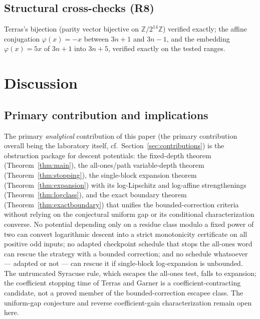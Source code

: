 \documentclass[11pt]{amsart}
\theoremstyle{definition}
\theoremstyle{remark}
\newcommand{\Z}{\mathbb{Z}}
\begin{document}
\subsection{Structural cross-checks (R8)}\label{sec:results-structure}
Terras's bijection (parity vector bijective on $\Z/2^{14}\Z$) verified exactly; the affine conjugation $\varphi(x) = -x$ between $3n+1$ and $3n-1$, and the embedding $\varphi(x) = 5x$ of $3n+1$ into $3n+5$, verified exactly on the tested ranges.

\section{Discussion}\label{sec:discussion}

\subsection*{Primary contribution and implications}
The primary \emph{analytical} contribution of this paper (the primary contribution overall being the laboratory itself, cf.\ Section~\ref{sec:contributions}) is the obstruction package for descent potentials: the fixed-depth theorem (Theorem~\ref{thm:main}), the all-ones/path variable-depth theorem (Theorem~\ref{thm:stopping}), the single-block expansion theorem (Theorem~\ref{thm:expansion}) with its log-Lipschitz and log-affine strengthenings (Theorem~\ref{thm:logclass}), and the exact boundary theorem (Theorem~\ref{thm:exactboundary}) that unifies the bounded-correction criteria without relying on the conjectural uniform gap or its conditional characterization converse. No potential depending only on a residue class modulo a fixed power of two can convert logarithmic descent into a strict monotonicity certificate on all positive odd inputs; no adapted checkpoint schedule that stops the all-ones word can rescue the strategy with a bounded correction; and no schedule whatsoever --- adapted or not --- can rescue it if single-block log-expansion is unbounded. The untruncated Syracuse rule, which escapes the all-ones test, falls to expansion; the coefficient stopping time of Terras and Garner is a coefficient-contracting candidate, not a proved member of the bounded-correction escapee class. The uniform-gap conjecture and reverse coefficient-gain characterization remain open here.
\end{document}
